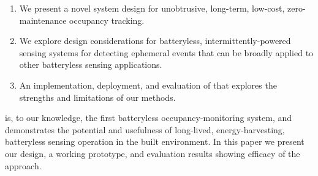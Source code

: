 \begin{enumerate}[label=\arabic*., align=left, leftmargin=*]
	\item We present a novel system design for unobtrusive, long-term, low-cost, zero-maintenance occupancy tracking.
	\item We explore design considerations for batteryless, intermittently-powered sensing systems for detecting ephemeral events that can be broadly applied to other batteryless sensing applications.
	\item An implementation, deployment, and evaluation of \sysname that explores the strengths and limitations of our methods.
\end{enumerate}

\noind
\sysname is, to our knowledge, the first batteryless occupancy-monitoring system, and demonstrates the potential and usefulness of long-lived, energy-harvesting, batteryless sensing operation in the built environment.
In this paper we present our design, a working prototype, and evaluation results showing efficacy of the approach.



